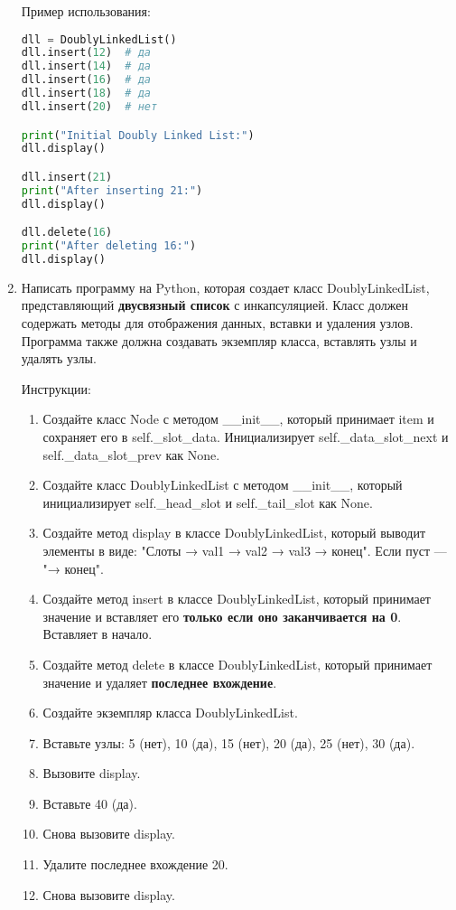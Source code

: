 \begin{enumerate}
Пример использования:
\begin{lstlisting}[language=Python]
dll = DoublyLinkedList()
dll.insert(12)  # да
dll.insert(14)  # да
dll.insert(16)  # да
dll.insert(18)  # да
dll.insert(20)  # нет

print("Initial Doubly Linked List:")
dll.display()

dll.insert(21)
print("After inserting 21:")
dll.display()

dll.delete(16)
print("After deleting 16:")
dll.display()
\end{lstlisting}

\item Написать программу на Python, которая создает класс DoublyLinkedList, представляющий \textbf{двусвязный список} с инкапсуляцией. Класс должен содержать методы для отображения данных, вставки и удаления узлов. Программа также должна создавать экземпляр класса, вставлять узлы и удалять узлы.

Инструкции:
\begin{enumerate}
    \item Создайте класс Node с методом \_\_init\_\_, который принимает item и сохраняет его в self.\_slot\_data. Инициализирует self.\_data\_slot\_next и self.\_data\_slot\_prev как None.
    \item Создайте класс DoublyLinkedList с методом \_\_init\_\_, который инициализирует self.\_head\_slot и self.\_tail\_slot как None.
    \item Создайте метод display в классе DoublyLinkedList, который выводит элементы в виде: "Слоты → val1 → val2 → val3 → конец". Если пуст — "→ конец".
    \item Создайте метод insert в классе DoublyLinkedList, который принимает значение и вставляет его \textbf{только если оно заканчивается на 0}. Вставляет в начало.
    \item Создайте метод delete в классе DoublyLinkedList, который принимает значение и удаляет \textbf{последнее вхождение}.
    \item Создайте экземпляр класса DoublyLinkedList.
    \item Вставьте узлы: 5 (нет), 10 (да), 15 (нет), 20 (да), 25 (нет), 30 (да).
    \item Вызовите display.
    \item Вставьте 40 (да).
    \item Снова вызовите display.
    \item Удалите последнее вхождение 20.
    \item Снова вызовите display.
\end{enumerate}


\end{enumerate}
